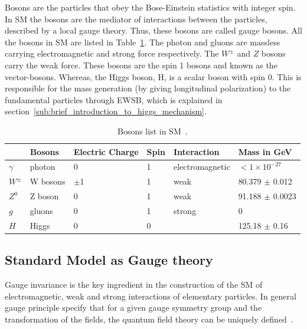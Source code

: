Bosons are the particles that obey the Bose-Einstein statistics with integer spin. In SM the bosons are the mediator of interactions between the particles, described by a local gauge theory. Thus, these bosons are called gauge bosons. All the bosons in SM are listed in Table~\ref{table:smbosons}.
The photon and gluons are massless carrying electromagnetic and strong force respectively. The $W^{\pm}$ and $Z$ bosons carry the weak force. These bosons are the spin 1 bosons and known as the vector-bosons. Whereas, the Higgs boson, H, is a scalar boson with spin 0. This is responsible for the mass generation (by giving longitudinal polarization) to the fundamental particles through EWSB, which is explained in section~\ref{sub:brief_introduction_to_higgs_mechanism}.

\begin{table}
\centering
\begin{tabular}[!htbp]{l l l l l l}
\hline
    & \textbf{Bosons} & \textbf{Electric Charge} & \textbf{Spin} & \textbf{Interaction} & \textbf{Mass in GeV} \\
\hline
$\gamma$  & photon   & 0      & 1 & electromagnetic   &   $<1 \times 10^{-27}$ \\
$W^{\pm}$ & W bosons & $\pm$1 & 1 & weak              &  80.379 $\pm$ 0.012    \\
$Z^0$     & Z boson  & 0      & 1 & weak              &  91.188 $\pm$ 0.0023    \\
$g$       & gluons   & 0      & 1 & strong            &  0                     \\
\hline
$H$       & Higgs    & 0      & 0 &                    & 125.18 $\pm$ 0.16     \\
\hline
\end{tabular}
\caption{Bosons list in SM~\cite{PDG2018}.}
\label{table:smbosons}
\end{table}

\subsection{Standard Model as Gauge theory}
Gauge invariance is the key ingredient in the construction of the SM of electromagnetic, weak and strong interactions of elementary particles. In general gauge principle specify that for a given gauge symmetry group and the transformation of the fields, the quantum field theory can be uniquely defined~\cite{Coughlan2006}.

